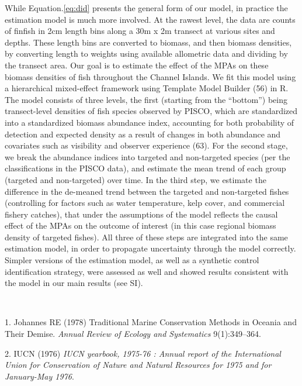 \documentclass[9pt,twocolumn,twoside,lineno]{pnas-new}
\begin{document}
While Equation.\ref{eq:did} presents the general form of our model, in
practice the estimation model is much more involved. At the rawest
level, the data are counts of finfish in 2cm length bins along a 30m x
2m transect at various sites and depths. These length bins are converted
to biomass, and then biomass densities, by converting length to weights
using available allometric data and dividing by the transect area. Our
goal is to estimate the effect of the MPAs on these biomass densities of
fish throughout the Channel Islands. We fit this model using a
hierarchical mixed-effect framework using Template Model Builder (56) in
R. The model consists of three levels, the first (starting from the
``bottom'') being transect-level densities of fish species observed by
PISCO, which are standardized into a standardized biomass abundance
index, accounting for both probability of detection and expected density
as a result of changes in both abundance and covariates such as
visibility and observer experience (63). For the second stage, we break
the abundance indices into targeted and non-targeted species (per the
classifications in the PISCO data), and estimate the mean trend of each
group (targeted and non-targeted) over time. In the third step, we
estimate the difference in the de-meaned trend between the targeted and
non-targeted fishes (controlling for factors such as water temperature,
kelp cover, and commercial fishery catches), that under the assumptions
of the model reflects the causal effect of the MPAs on the outcome of
interest (in this case regional biomass density of targeted fishes). All
three of these steps are integrated into the same estimation model, in
order to propagate uncertainty through the model correctly. Simpler
versions of the estimation model, as well as a synthetic control
identification strategy, were assessed as well and showed results
consistent with the model in our main results (see SI).

\showacknow

~ ~ ~

\hypertarget{refs}{}
\leavevmode\hypertarget{ref-johannes1978}{}%
1. Johannes RE (1978) Traditional Marine Conservation Methods in Oceania
and Their Demise. \emph{Annual Review of Ecology and Systematics}
9(1):349--364.

\leavevmode\hypertarget{ref-iucn1976}{}%
2. IUCN (1976) \emph{IUCN yearbook, 1975-76 : Annual report of the
International Union for Conservation of Nature and Natural Resources for
1975 and for January-May 1976}.
\end{document}
